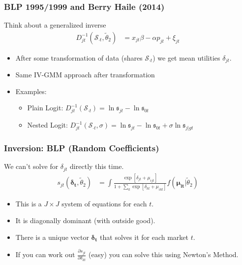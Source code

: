 \documentclass[xcolor=pdftex,dvipsnames,table,mathserif,aspectratio=169]{beamer}
\begin{document}
\begin{frame}
\frametitle{BLP 1995/1999 and Berry Haile (2014)}
Think about a \alert{generalized inverse}
\begin{align*}
D_{jt}^{-1}(\mathcal{S}_{\cdot t},\widetilde{\theta}_2)&= x_{jt} \beta -\alpha p_{jt} +  \xi_{jt} 
\end{align*}
 \begin{itemize}
\item After some transformation of data (shares $\mathcal{S}_{\cdot t}$) we get \alert{mean utilities} $\delta_{jt}$.
\item Same IV-GMM approach after transformation
\item Examples:
\begin{itemize}
\item Plain Logit: $D_{jt}^{-1}(\mathcal{S}_{\cdot t}) = \ln \mathfrak{s}_{jt}- \ln \mathfrak{s}_{0t}$
\item Nested Logit: $D_{jt}^{-1}(\mathcal{S}_{\cdot t},\sigma) = \ln \mathfrak{s}_{jt}- \ln \mathfrak{s}_{0t} + \sigma  \ln \mathfrak{s}_{j|gt}$
 \end{itemize}
 \end{itemize}
\end{frame}


\begin{frame}
\frametitle{Inversion: BLP (Random Coefficients)}
We can't solve for $\delta_{jt}$ directly this time.
\begin{align*}
s_{jt}(\boldsymbol{\delta_{t}},\widetilde{\theta}_2) &= \int \frac{\exp[\delta_{jt} + \mu_{ijt} ]}{1+\sum_k \exp[\delta_{kt} +  \mu_{ikt}  ]} f(\boldsymbol{\mu_{it}} | \widetilde{\theta}_2)
\end{align*}
 \begin{itemize}
 \item This is a $J \times J$ system of equations for each $t$.
 \item It is diagonally dominant (with outside good).
 \item There is a unique vector $\boldsymbol{\delta_{t}}$ that solves it for each market $t$.
 \item If you can work out $\frac{\partial s_{jt}}{\partial \delta_{kt}}$ (easy) you can solve this using Newton's Method.
 \end{itemize}
\end{frame}
\end{document}
